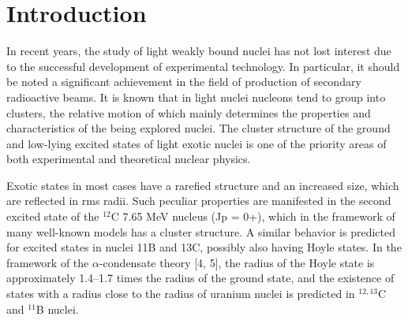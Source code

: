 \documentclass[
12pt, %
oneside, %
english, %
onehalfspacing, %
onehalfspacing, %
headsepline, %
]{MastersDoctoralThesis} %
\begin{document}



\mainmatter %

\pagestyle{thesis} %


\chapter{Introduction} %
In recent years, the study of light weakly bound nuclei  has not lost interest due to the successful development of experimental technology. 
In particular, it should be noted a significant achievement in the field of production of secondary radioactive beams. 
It is known that in light nuclei nucleons tend to group into clusters, the relative motion of which mainly determines the properties and characteristics of the being explored nuclei. 
The cluster structure of the ground and low-lying excited states of light exotic nuclei is one of the priority areas of both experimental and theoretical nuclear physics.


Exotic states in most cases have a rarefied structure and an increased size, which are reflected in rms radii. Such peculiar properties are manifested in the second excited state of the $^{12}$C 7.65 MeV nucleus (Jp = 0+), which in the framework of many well-known models has a cluster structure. 
A similar behavior is predicted for excited states in nuclei 11B and 13C, possibly also having Hoyle states.
 In the framework of the $\alpha$-condensate theory [4, 5], the radius of the Hoyle state is approximately 1.4–1.7 times the radius of the ground state, and the existence of states with a radius close to the radius of uranium nuclei is predicted in $^{12,13}$C and $^{11}$B nuclei.
\end{document}
